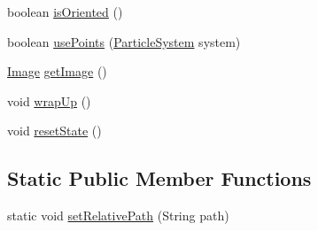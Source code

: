 \begin{DoxyCompactItemize}
boolean \mbox{\hyperlink{classorg_1_1newdawn_1_1slick_1_1particles_1_1_configurable_emitter_a1435dc04f4e3a38ba5af82650ca3f9ea}{is\+Oriented}} ()
\item 
boolean \mbox{\hyperlink{classorg_1_1newdawn_1_1slick_1_1particles_1_1_configurable_emitter_a8034277f8d85d47a5460665c5212d351}{use\+Points}} (\mbox{\hyperlink{classorg_1_1newdawn_1_1slick_1_1particles_1_1_particle_system}{Particle\+System}} system)
\item 
\mbox{\hyperlink{classorg_1_1newdawn_1_1slick_1_1_image}{Image}} \mbox{\hyperlink{classorg_1_1newdawn_1_1slick_1_1particles_1_1_configurable_emitter_a27d040118a59ae29818f23ceb97f37f8}{get\+Image}} ()
\item 
void \mbox{\hyperlink{classorg_1_1newdawn_1_1slick_1_1particles_1_1_configurable_emitter_a641b7c71e746caa939d3a2c16976b4e4}{wrap\+Up}} ()
\item 
void \mbox{\hyperlink{classorg_1_1newdawn_1_1slick_1_1particles_1_1_configurable_emitter_a91eff5a7a412cfed942a10a261a4432e}{reset\+State}} ()
\end{DoxyCompactItemize}
\subsection*{Static Public Member Functions}
\begin{DoxyCompactItemize}
\item 
static void \mbox{\hyperlink{classorg_1_1newdawn_1_1slick_1_1particles_1_1_configurable_emitter_a5967ce7e74bac69b8bf2ab427ae573b9}{set\+Relative\+Path}} (String path)
\end{DoxyCompactItemize}
